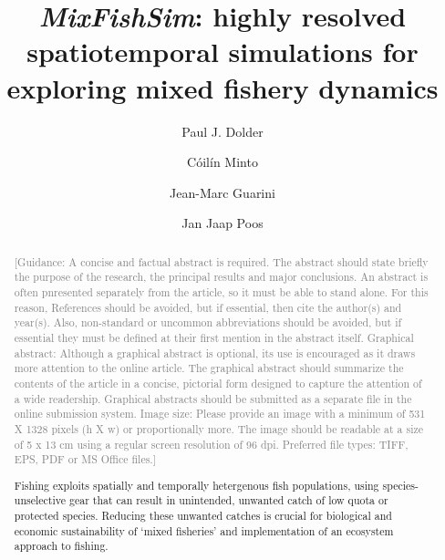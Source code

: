 \documentclass[review]{elsarticle}
\begin{document}
\begin{frontmatter}
\title{\emph{MixFishSim}: highly resolved spatiotemporal simulations for
	exploring mixed fishery dynamics}


\author[1,2]{Paul J. Dolder}

\author[1]{Cóilín Minto}
\author[3]{Jean-Marc Guarini}
\author[4]{Jan Jaap Poos}

\address[1]{Galway-Mayo Institute of Technology (GMIT), Dublin Road, Galway,
	Ireland} 
\address[2]{Centre for Environment, Fisheries and Aquaculture Science (Cefas),
	Pakefield Road, Lowestoft, UK}
\address[3]{Université Pierre et Marie Curie, 4 Place Jussieu, 75005 Paris,
	France}
\address[4]{Wageningen Marine Research, Haringkade 1 1976 CP IJmuiden,
	Netherlands}

\begin{abstract}
\textcolor{gray}{[Guidance: A concise and factual abstract is required. The abstract 
should state briefly the purpose of the research, the principal results and
major conclusions. An abstract is often pnresented separately from the article,
so it must be able to stand alone. For this reason, References should be
avoided, but if essential, then cite the author(s) and year(s). Also,
non-standard or uncommon abbreviations should be avoided, but if essential they
must be defined at their first mention in the abstract itself.  Graphical
abstract: Although a graphical abstract is optional, its use is encouraged as
it draws more attention to the online article. The graphical abstract should
summarize the contents of the article in a concise, pictorial form designed to
capture the attention of a wide readership. Graphical abstracts should be
submitted as a separate file in the online submission system. Image size:
Please provide an image with a minimum of 531 X 1328 pixels (h X w) or
proportionally more. The image should be readable at a size of 5 x 13 cm using
a regular screen resolution of 96 dpi.  Preferred file types: TIFF, EPS, PDF or
MS Office files.] \\}

Fishing exploits spatially and temporally hetergenous fish populations, using
species-unselective gear that can result in unintended, unwanted catch of low
quota or protected species. Reducing these unwanted catches is crucial for
biological and economic sustainability of `mixed fisheries' and implementation
of an ecosystem approach to fishing. \\


\end{abstract}
\end{frontmatter}
\end{document}

